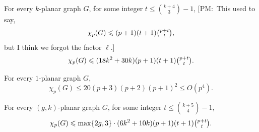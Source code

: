 \documentclass{patmorin}
\newcommand{\note}[2]{{\color{red}[#1:~#2]}}
\renewcommand{\ge}{\geqslant}
\renewcommand{\le}{\leqslant}
\renewcommand{\leq}{\leqslant}
\newcommand{\treewidth}{\ensuremath{\binom{k+4}{3}}-1}
\begin{document}

\begin{cor}
\label{pck}
For every $k$-planar graph $G$, for some integer $t\leq \binom{k+4}{3}-1$, 
\note{PM}{This used to say, \color{red} $$\chi_p(G)\le (p+1) (t+1)\tbinom{p+t}{t},$$ but I think we forgot the factor $\ell$.}
$$\chi_p(G)\le (18k^2+30k)(p+1) (t+1)\tbinom{p+t}{t}.$$
\end{cor}

\begin{cor}
\label{pc1}
For every $1$-planar graph $G$, 
$$\chi_p(G)\le 20 (p+3)(p+2)(p+1)^2\le O(p^4).$$
\end{cor}

\begin{cor}
\label{pcgk}
For every $(g,k)$-planar graph $G$,  for some integer $t\leq \binom{k+5}{4}-1$, 
$$\chi_p(G) \le \max\{2g,3\}\cdot(6k^2 + 10k) (p+1) (t+1)\tbinom{p+t}{t}.$$
\end{cor}


\end{document}
